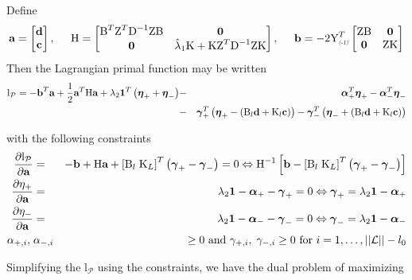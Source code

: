 \documentclass[12pt]{article}
\newcommand{\bfeta}{\mbox{\boldmath $\eta$}}
\newcommand{\bfgamma}{\mbox{\boldmath $\gamma$}}
\newcommand{\bfalpha}{\mbox{\boldmath $\alpha$}}
\newcommand{\bfo}{\mbox{\boldmath $0$}}
\newcommand{\bfone}{\mbox{\boldmath $1$}}
\newcommand{\bfa}{\mbox{\bf a}}
\newcommand{\bfb}{\mbox{\bf b}}
\newcommand{\bfd}{\mbox{\bf d}}
\newcommand{\bfc}{\mbox{\bf c}}
\newcommand{\bigY}{\mbox{Y}}
\newcommand{\matK}{\mbox{K}}
\newcommand{\matH}{\mbox{H}}
\newcommand{\matB}{\mbox{B}}
\newcommand{\matD}{\mbox{D}}
\newcommand{\matZ}{\mbox{Z}}
\begin{document}
Define
\[
\bfa = \begin{bmatrix} \bfd\\ \bfc \end{bmatrix},\;\;\;\;\; \matH = \begin{bmatrix} \matB^T\matZ^T\matD^{-1}\matZ \matB & \bfo \\ \bfo & \hat{\lambda}_1\matK + \matK\matZ^T\matD^{-1}\matZ \matK   \end{bmatrix},\;\;\;\;\;\bfb = -2\bigY_{\textsc{\relsize{-2}{\textsl{(-1)}}}}^T\begin{bmatrix}\matZ\matB & \bfo \\ \bfo & \matZ\matK \end{bmatrix}
\]
\noindent
Then the Lagrangian primal function may be written
\begin{eqnarray}
\mathrm{l}_{\mathcal{P}} = -\bfb^T\bfa + \frac{1}{2}\bfa^T \matH \bfa + \lambda_2 \bfone^T\left( \bfeta_{+}+ \bfeta_{-}\right) &-& \bfalpha_+^T\bfeta_+ - \bfalpha_-^T\bfeta_{-} \label{lagrange_primal} \\ \nonumber
 &-& \bfgamma_+^T\left(\bfeta_+ - \left(\matB_l\bfd + \matK_l\bfc \right)  \right) - \bfgamma_-^T\left(\bfeta_- + \left(\matB_l\bfd + \matK_l\bfc \right)  \right) 
\end{eqnarray}

with the following constraints
\begin{eqnarray*}
\frac{\partial \mathrm{l}_{\mathcal{P}}}{\partial \bfa} &=& -\bfb + \matH\bfa + \left[ \matB_l\;\matK_L \right]^T \left(\bfgamma_+ - \bfgamma_- \right) = 0 \Leftrightarrow \matH^{-1}\left[ \bfb - \left[ \matB_l\;\matK_L \right]^T \left(\bfgamma_+ - \bfgamma_-\right) \right]  \\
\frac{\partial \eta_+}{\partial \bfa} &=& \lambda_2\bfone - \bfalpha_+ - \bfgamma_+ = 0 \Leftrightarrow \bfgamma_+ = \lambda_2\bfone - \bfalpha_+\\
\frac{\partial \eta_-}{\partial \bfa} &=& \lambda_2\bfone - \bfalpha_- - \bfgamma_- = 0 \Leftrightarrow \bfgamma_- = \lambda_2 \bfone - \bfalpha_-\\
\alpha_{+,i},\;&\alpha_{-,i}& \ge 0 \mbox{ and } \gamma_{+,i},\;\gamma_{-,i} \ge0 \mbox{ for }i=1,\dots,\vert \vert \mathcal{L}\vert \vert-l_0
\end{eqnarray*}

Simplifying the $\mathrm{l}_\mathcal{P}$ using the constraints, we have the dual problem of maximizing
\end{document}
